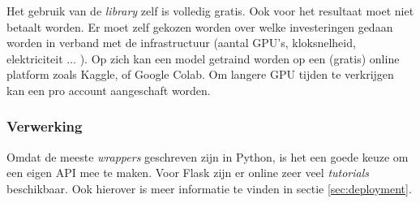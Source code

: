 Het gebruik van de \textit{library} zelf is volledig gratis. Ook voor het resultaat moet niet betaalt worden. Er moet zelf gekozen worden over welke investeringen gedaan worden in verband met de infrastructuur (aantal GPU's, kloksnelheid, elektriciteit ... ). Op zich kan een model getraind worden op een (gratis) online platform zoals Kaggle, of Google Colab. Om langere GPU tijden te verkrijgen kan een pro account aangeschaft worden.

\subsubsection{Verwerking}
\label{sucsubsec:autokeras-nfr-verwerking}

Omdat de meeste \textit{wrappers} geschreven zijn in Python, is het een goede keuze om een eigen API mee te maken. Voor Flask zijn er online zeer veel \textit{tutorials} beschikbaar. Ook hierover is meer informatie te vinden in sectie \ref{sec:deployment}.